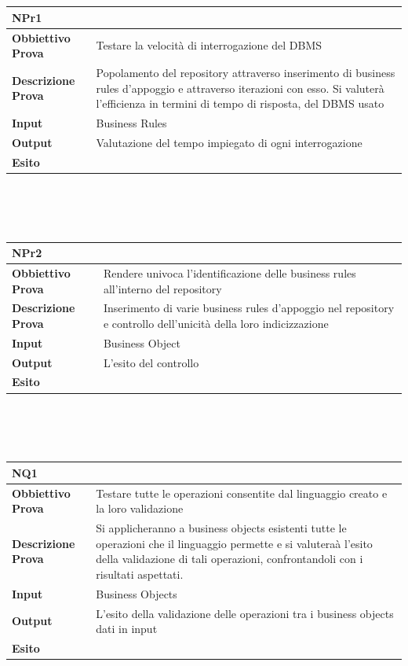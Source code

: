 \documentclass[11pt,titlepage,a4paper]{report}
\begin{document}
\\
\\
\begin{tabular}{||p{4.5cm}||p{7.5cm}||}
\hline
\textbf{\textsf{NPr1}}& \\
\hline
{\textbf{Obbiettivo Prova}}& Testare la velocit\`a di interrogazione del DBMS\\ \hline
{\textbf{Descrizione Prova}}& Popolamento del repository attraverso inserimento di business rules d'appoggio e attraverso iterazioni con esso. Si valuter\`a l'efficienza in termini di tempo di risposta, del DBMS usato  \\ \hline
{\textbf{Input}}& Business Rules \\ \hline
{\textbf{Output}}& Valutazione del tempo impiegato di ogni interrogazione \\ \hline
{\textbf{Esito}}&  \\ \hline
\end{tabular} \\
\\
\\
\begin{tabular}{||p{4.5cm}||p{7.5cm}||}
\hline
\textbf{\textsf{NPr2}}& \\
\hline
{\textbf{Obbiettivo Prova}}& Rendere univoca l'identificazione delle business rules all'interno del repository \\ \hline
{\textbf{Descrizione Prova}}& Inserimento di varie business rules d'appoggio nel repository e controllo dell'unicit\`a della loro indicizzazione \\ \hline
{\textbf{Input}}& Business Object \\ \hline
{\textbf{Output}}& L'esito del controllo\\ \hline
{\textbf{Esito}}&  \\ \hline
\end{tabular} \\
\\
\\
\begin{tabular}{||p{4.5cm}||p{7.5cm}||}
\hline
\textbf{\textsf{NQ1}}& \\
\hline
{\textbf{Obbiettivo Prova}}& Testare tutte le operazioni consentite dal linguaggio creato e la loro validazione\\ \hline
{\textbf{Descrizione Prova}}& Si applicheranno a business objects esistenti tutte le operazioni che il linguaggio permette e si valutera\`a l'esito della validazione di tali operazioni, confrontandoli con i risultati aspettati.  \\ \hline
{\textbf{Input}}& Business Objects \\ \hline
{\textbf{Output}}& L'esito della validazione delle operazioni tra i business objects dati in input\\ \hline
{\textbf{Esito}}&  \\ \hline
\end{tabular} \\
\end{document}
